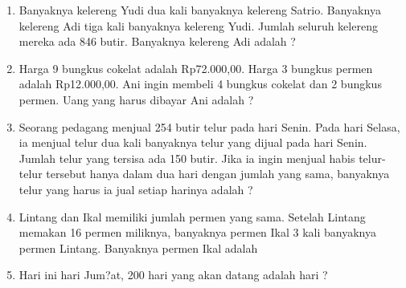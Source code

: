 \documentclass[12pt,a4paper,draft,final,oneside,twoside,openright,openany]{article}
\begin{document}
\begin{enumerate}
	\item Banyaknya  kelereng  Yudi  dua  kali  banyaknya  kelereng  Satrio.  Banyaknya  kelereng  Adi
	tiga  kali  banyaknya  kelereng  Yudi.  Jumlah  seluruh  kelereng  mereka  ada  846  butir.
	Banyaknya  kelereng  Adi  adalah ?
	\item Harga  9  bungkus  cokelat  adalah  Rp72.000,00.  Harga  3  bungkus  permen  adalah
	Rp12.000,00.  Ani  ingin  membeli  4  bungkus  cokelat  dan  2  bungkus  permen.  Uang  yang
	harus  dibayar  Ani  adalah ?
	\item Seorang pedagang menjual 254 butir telur pada hari Senin. Pada hari Selasa, ia menjual
	telur dua kali banyaknya telur yang dijual pada hari Senin. Jumlah telur yang tersisa ada
	150  butir.  Jika  ia  ingin  menjual  habis  telur-telur  tersebut  hanya  dalam  dua  hari  dengan
	jumlah  yang  sama,  banyaknya  telur  yang  harus  ia  jual  setiap  harinya  adalah ?
	\item Lintang dan Ikal memiliki jumlah permen yang sama. Setelah Lintang memakan 16 permen
	miliknya,  banyaknya  permen  Ikal  3  kali  banyaknya  permen  Lintang.  Banyaknya  permen
	Ikal  adalah  
	\item Hari ini hari Jum?at, 200 hari yang akan datang adalah hari ?
\end{enumerate}
\end{document}
